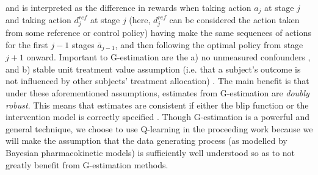 \noindent and is interpreted as the difference in rewards when  taking action $a_j$ at stage $j$ and taking action $d_j^{ref}$ at stage $j$ (here, $d_j^{ref}$  can be considered the action taken from some reference or control policy) having make the same sequences of actions for the first $j-1$ stages $\bar{a}_{j-1}$, and then following the optimal policy from stage $j+1$ onward. Important to G-estimation are the a) no unmeasured confounders , and b) stable unit treatment value assumption (i.e. that a subject's outcome is not influenced by other subjects' treatment allocation) \cite{chakraborty_dynamic_2014}.  The main benefit is that under these aforementioned assumptions, estimates from G-estimation are \textit{doubly robust}.  This means that estimates are consistent if either the blip function or the intervention model is correctly specified  \cite{rich2010model}. Though G-estimation is a powerful and general technique, we choose to use Q-learning in the proceeding work because we will make the assumption that the data generating process (as modelled by Bayesian pharmacokinetic models) is sufficiently well understood so as to not greatly benefit from G-estimation methods.
